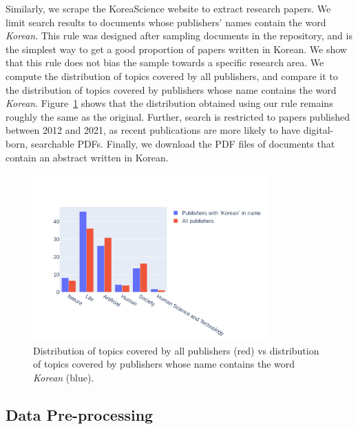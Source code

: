 Similarly, we scrape the KoreaScience website to extract research papers. We limit search results to documents whose publishers' names contain the word \emph{Korean}. This rule was designed after sampling documents in the repository, and is the simplest way to get a good proportion of papers written in Korean. We show that this rule does not bias the sample towards a specific research area. We compute the distribution of topics covered by all publishers, and compare it to the distribution of topics covered by publishers whose name contains the word \textit{Korean}. Figure~\ref{fig:distr-koreascience-topics} shows that the distribution obtained using our rule remains roughly the same as the original. Further, search is restricted to papers published between 2012 and 2021, as recent publications are more likely to have digital-born, searchable PDFs. Finally, we download the PDF files of documents that contain an abstract written in Korean. 

\begin{figure}
\centering
    \includegraphics[width=0.8\textwidth]{images/chapter5/koreascience_topic_distr.pdf}
  \caption{Distribution of topics covered by all publishers (red) vs distribution of topics covered by publishers whose name contains the word \textit{Korean} (blue).}
  \label{fig:distr-koreascience-topics}
\end{figure}

\subsection{Data Pre-processing}

